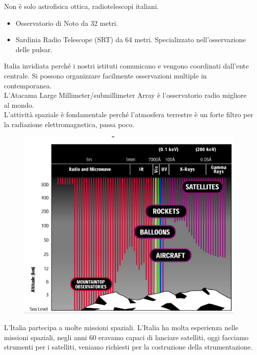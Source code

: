 \documentclass[a4paper,11pt]{article}
\begin{document}
Non è solo astrofisica ottica, radiotelescopi italiani.
\begin{itemize}
    \item Osservatorio di Noto da 32 metri.
    \item Sardinia Radio Telescope (SRT) da 64 metri. Specializzato nell'osservazione delle pulsar.
\end{itemize}
Italia invidiata perché i nostri istituti comunicano e vengono coordinati dall'ente centrale. Si possono organizzare facilmente osservazioni multiple in contemporanea.\\
L'Atacama Large Millimeter/submillimeter Array è l'osservatorio radio migliore al mondo.\\
L'attività spaziale è fondamentale perché l'atmosfera terrestre è un forte filtro per la radiazione elettromagnetica, passa poco.
\begin{figure}[ht]
    \centering
    \includegraphics[width=8 cm]{Radiazione-atmosfera.png}
\end{figure}
L'Italia partecipa a molte missioni spaziali. L'Italia ha molta esperienza nelle missioni spaziali, negli anni 60 eravamo capaci di lanciare satelliti, oggi facciamo strumenti per i satelliti, veniamo richiesti per la costruzione della strumentazione.
\end{document}
